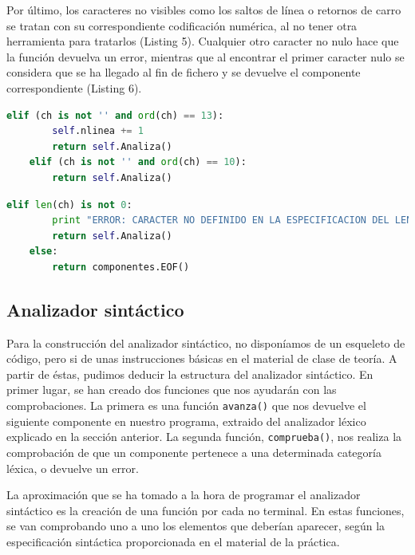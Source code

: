 \documentclass[11pt]{article}
\begin{document}
Por último, los caracteres no visibles como los saltos de línea o retornos de carro se tratan con su correspondiente codificación numérica, al no tener otra herramienta para tratarlos (Listing 5). Cualquier otro caracter no nulo hace que la función devuelva un error, mientras que al encontrar el primer caracter nulo se considera que se ha llegado al fin de fichero y se devuelve el componente correspondiente (Listing 6).

\begin{lstlisting}[language=Python, caption=Caracteres no visibles]
	elif (ch is not '' and ord(ch) == 13):
    	self.nlinea += 1
    	return self.Analiza()
	elif (ch is not '' and ord(ch) == 10):
    	return self.Analiza()
\end{lstlisting}

\begin{lstlisting}[language=Python, caption=Errores y fin de fichero]
	elif len(ch) is not 0:
    	print "ERROR: CARACTER NO DEFINIDO EN LA ESPECIFICACION DEL LENGUAJE"
    	return self.Analiza()
	else:
    	return componentes.EOF()
\end{lstlisting}

\subsection{Analizador sintáctico}
Para la construcción del analizador sintáctico, no disponíamos de un esqueleto de código, pero si de unas instrucciones básicas en el material de clase de teoría. A partir de éstas, pudimos deducir la estructura del analizador sintáctico. En primer lugar, se han creado dos funciones que nos ayudarán con las comprobaciones. La primera es una función \lstinline[language=Python]{avanza()} que nos devuelve el siguiente componente en nuestro programa, extraido del analizador léxico explicado en la sección anterior. La segunda función, \lstinline[language=Python]{comprueba()}, nos realiza la comprobación de que un componente pertenece a una determinada categoría léxica, o devuelve un error. 

La aproximación que se ha tomado a la hora de programar el analizador sintáctico es la creación de una función por cada no terminal. En estas funciones, se van comprobando uno a uno los elementos que deberían aparecer, según la especificación sintáctica proporcionada en el material de la práctica. 
\end{document}
